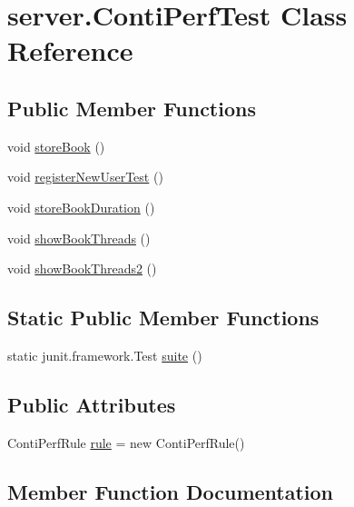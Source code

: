 \hypertarget{classserver_1_1_conti_perf_test}{}\section{server.\+Conti\+Perf\+Test Class Reference}
\label{classserver_1_1_conti_perf_test}
\subsection*{Public Member Functions}
\begin{DoxyCompactItemize}
\item 
void \hyperlink{classserver_1_1_conti_perf_test_a4519e539cdbf6975489a13d246a96dac}{store\+Book} ()
\item 
void \hyperlink{classserver_1_1_conti_perf_test_acacbe8ed83af069e2efcf720459e2ea8}{register\+New\+User\+Test} ()
\item 
void \hyperlink{classserver_1_1_conti_perf_test_acc7afc2bd786df7421391f55cba0b6fb}{store\+Book\+Duration} ()
\item 
void \hyperlink{classserver_1_1_conti_perf_test_a8dc9d4ff544289aaa6cfc25f7dfc784f}{show\+Book\+Threads} ()
\item 
void \hyperlink{classserver_1_1_conti_perf_test_aa2bd1869a97663b983e81a1904788e6d}{show\+Book\+Threads2} ()
\end{DoxyCompactItemize}
\subsection*{Static Public Member Functions}
\begin{DoxyCompactItemize}
\item 
static junit.\+framework.\+Test \hyperlink{classserver_1_1_conti_perf_test_a739c19f2d3d32240270589eb76a7e25e}{suite} ()
\end{DoxyCompactItemize}
\subsection*{Public Attributes}
\begin{DoxyCompactItemize}
\item 
Conti\+Perf\+Rule \hyperlink{classserver_1_1_conti_perf_test_a6caa32512d9e7998889ab0126a9a1115}{rule} = new Conti\+Perf\+Rule()
\end{DoxyCompactItemize}


\subsection{Member Function Documentation}
\mbox{\label{classserver_1_1_conti_perf_test_acacbe8ed83af069e2efcf720459e2ea8}} 
